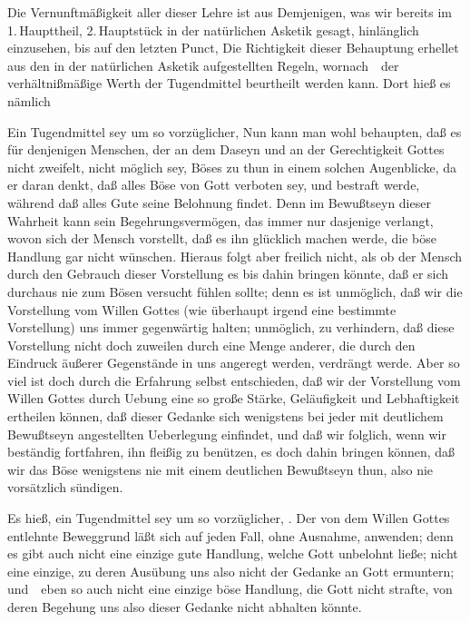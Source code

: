 Die Vernunftmäßigkeit aller dieser Lehre ist aus Demjenigen, was wir bereits im 1.\,Haupttheil, 2.\,Hauptstück in der natürlichen Asketik gesagt, hinlänglich einzusehen, bis auf den letzten Punct,  Die Richtigkeit dieser Behauptung erhellet aus den in der natürlichen Asketik aufgestellten Regeln, wornach~\ der verhältnißmäßige Werth der Tugendmittel beurtheilt werden kann. Dort hieß es nämlich
\begin{aufzb}
\item Ein Tugendmittel sey um so vorzüglicher,  Nun kann man wohl behaupten, daß es für denjenigen Menschen, der an dem Daseyn und an der Gerechtigkeit Gottes nicht zweifelt, nicht möglich sey, Böses zu thun in einem solchen Augenblicke, da er daran denkt, daß alles Böse von Gott verboten sey, und bestraft werde, während daß alles Gute seine Belohnung findet. Denn im Bewußtseyn dieser Wahrheit kann sein Begehrungsvermögen, das immer nur dasjenige verlangt, wovon sich der Mensch vorstellt, daß es ihn glücklich machen werde, die böse Handlung gar nicht wünschen. Hieraus folgt aber freilich nicht, als ob der Mensch durch den Gebrauch dieser Vorstellung es bis dahin bringen könnte, daß er sich durchaus nie zum Bösen versucht fühlen sollte; denn es ist unmöglich, daß wir die Vorstellung vom Willen Gottes (wie überhaupt irgend eine bestimmte Vorstellung) uns immer gegenwärtig halten; unmöglich, zu verhindern, daß diese Vorstellung nicht doch zuweilen durch eine Menge anderer, die durch den Eindruck äußerer Gegenstände in uns angeregt werden, verdrängt werde. Aber so viel ist doch durch die Erfahrung selbst entschieden, daß wir der Vorstellung vom Willen Gottes durch Uebung eine so große Stärke, Geläufigkeit und Lebhaftigkeit ertheilen können, daß dieser Gedanke sich wenigstens bei jeder mit deutlichem Bewußtseyn angestellten Ueberlegung einfindet, und daß wir folglich, wenn wir beständig fortfahren, ihn fleißig zu benützen, es doch dahin bringen können, daß wir das Böse wenigstens nie mit einem deutlichen Bewußtseyn thun, also nie vorsätzlich sündigen.
\item Es hieß, ein Tugendmittel sey um so vorzüglicher, . Der von dem Willen Gottes entlehnte Beweggrund läßt sich auf jeden Fall, ohne Ausnahme, anwenden; denn es gibt auch nicht eine einzige gute Handlung, welche Gott unbelohnt ließe; nicht eine einzige, zu deren Ausübung uns also nicht der Gedanke an Gott ermuntern; und~\ eben so auch nicht eine einzige böse Handlung, die Gott nicht strafte, von deren Begehung uns also dieser Gedanke nicht abhalten könnte.

\end{aufzb}
